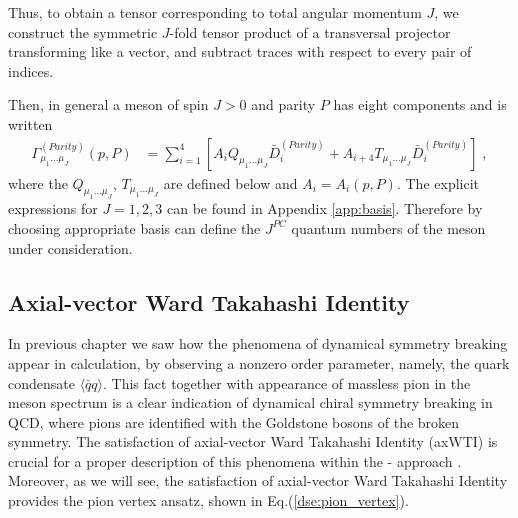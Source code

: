 Thus, to obtain a tensor corresponding to total angular momentum $J$, we construct the 
symmetric $J$-fold tensor product of a transversal projector transforming like a vector, and 
subtract traces with respect to every pair of indices. 

Then, in general a meson of spin $J>0$ and parity $P$ has eight components and is written
%
\begin{align}
\Gamma^{(Parity)}_{\mu_1\ldots\mu_J}(p,P) &= \sum_{i=1}^{4} \left[A_i Q_{\mu_1\ldots\mu_J} \bar{D}_{i}^{(Parity)}+A_{i+4} T_{\mu_1\ldots\mu_J} \bar{D}_{i}^{(Parity)}\right]\;,
\end{align}
%
where the $Q_{\mu_1\ldots\mu_J}$, $T_{\mu_1\ldots\mu_J}$ are defined below and $A_i = A_i(p,P)$. The explicit expressions for $J = 1,2,3$ can be found in Appendix \ref{app:basis}. Therefore by choosing appropriate basis can define the $J^{PC}$ quantum numbers of the meson under consideration. 

\subsection*{Axial-vector Ward Takahashi Identity}
\vspace{-0.5cm}
In previous chapter we saw how the phenomena of dynamical symmetry breaking appear in calculation, by observing a nonzero order parameter, namely, the quark condensate $\langle \bar q q \rangle$. This fact together with appearance of massless pion in the meson spectrum is a clear indication of dynamical chiral symmetry breaking in QCD, where pions are 	identified with the Goldstone bosons of the broken symmetry. The satisfaction of axial-vector Ward Takahashi Identity (axWTI) is crucial for a proper description of this phenomena within the \DS - \BSE approach \cite{Maris:1997hd}. Moreover, as we will see, the satisfaction of axial-vector Ward Takahashi Identity provides the pion vertex ansatz, shown in Eq.(\ref{dse:pion_vertex}). \\ 

